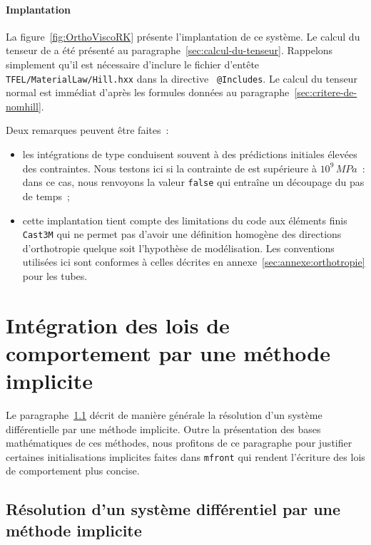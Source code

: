 \documentclass[rectoverso,pleiades,pstricks,leqno,anti]{texmf/note_technique_2010}
\newcommand{\mfront}{\texttt{mfront}}
\newcommand{\castem}{\texttt{Cast3M}}
\begin{document}
\paragraph{Implantation} La figure~\ref{fig:OrthoViscoRK} présente
l'implantation de ce système. Le calcul du tenseur de  a été
présenté au paragraphe~\ref{sec:calcul-du-tenseur}. Rappelons
simplement qu'il est nécessaire d'inclure le fichier d'entête {\tt
  TFEL/\-Material\-Law/\-Hill.hxx} dans la directive {\tt
  @Includes}. Le calcul du tenseur normal est immédiat d'après les
formules données au paragraphe~\ref{sec:critere-de-nomhill}.

Deux remarques peuvent être faites~:
\begin{itemize}
  \item les intégrations de type  conduisent souvent à
  des prédictions initiales élevées des contraintes. Nous testons ici si
  la contrainte de  est supérieure à \(10^{9}\, MPa\)~: dans
  ce cas, nous renvoyons la valeur {\tt false} qui entraîne un découpage
  du pas de temps~;
  \item cette implantation tient compte des limitations du code aux
  éléments finis \castem{} qui ne permet pas d'avoir une définition
  homogène des directions d'orthotropie quelque soit l'hypothèse de
  modélisation. Les conventions utilisées ici sont conformes à celles
  décrites en annexe~\ref{sec:annexe:orthotropie} pour les tubes.
\end{itemize}

\clearpage
\newpage
\section{Intégration des lois de comportement par une méthode implicite}
\label{sec:Implicite}

Le paragraphe~\ref{sec:resol-dun-syst-implicite} décrit de manière
générale la résolution d'un système différentielle par une méthode
implicite. Outre la présentation des bases mathématiques de ces
méthodes, nous profitons de ce paragraphe pour justifier certaines
initialisations implicites faites dans \mfront{} qui rendent l'écriture
des lois de comportement plus concise.

\subsection{Résolution d'un système différentiel par une méthode implicite}
\label{sec:resol-dun-syst-implicite}
\end{document}
